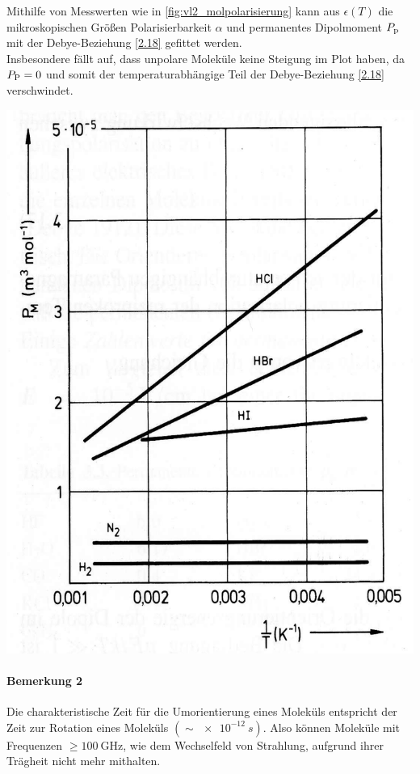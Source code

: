     \begin{verbal_sidebyside}[0.5\linewidth]
        Mithilfe von Messwerten wie in \autoref{fig:vl2_molpolarisierung} kann aus $\epsilon(T)$ die mikroskopischen Größen Polarisierbarkeit $\alpha$ und permanentes Dipolmoment $P_\text p$ mit der Debye-Beziehung \eqref{2.18} gefittet werden.\\

        Insbesondere fällt auf, dass unpolare Moleküle keine Steigung im Plot haben, da $P_\text P=0$ und somit der temperaturabhängige Teil der Debye-Beziehung \eqref{2.18} verschwindet.
        
        \tcblower
        \centering
        \includegraphics[width=\linewidth]{figures/vl2_molpolarisierung.png}
        \label{fig:vl2_molpolarisierung}
    \end{verbal_sidebyside}

\paragraph{Bemerkung 2}
    Die charakteristische Zeit für die Umorientierung eines Moleküls entspricht der Zeit zur Rotation eines Moleküls $\left( \sim \SI{e-12}{s} \right)$. Also können Moleküle mit Frequenzen $\ge \SI{100}{\giga \hertz}$, wie dem Wechselfeld von Strahlung, aufgrund ihrer Trägheit nicht mehr mithalten.
